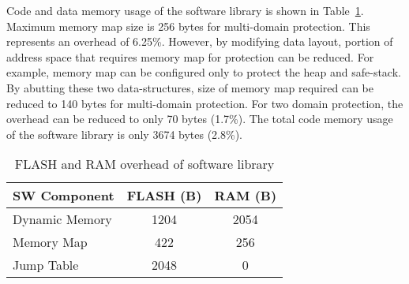 %
%
%
%
%
%
Code and data memory usage of the software library is shown in Table~\ref{tab:swlibsize}.
%
Maximum memory map size is 256 bytes for multi-domain protection.
%
This represents an overhead of 6.25\%.
%
However, by modifying data layout, portion of address space that requires memory map for protection can be reduced.
%
For example, memory map can be configured only to protect the heap and safe-stack.
%
By abutting these two data-structures, size of memory map required can be reduced to 140 bytes for multi-domain protection.
%
For two domain protection, the overhead can be reduced to only 70 bytes (1.7\%).
%
The total code memory usage of the software library is only 3674 bytes (2.8\%).
%
\begin{table}[htdp]
\centering
\small{
\begin{tabular}{|l|c|c|}
	\hline
	SW Component & FLASH (B) & RAM (B)\\
	\hline
	Dynamic Memory & 1204 & 2054\\
	Memory Map & 422 & 256 \\
	Jump Table & 2048 & 0 \\
	\hline
\end{tabular}}
\caption{FLASH and RAM overhead of software library}
\label{tab:swlibsize}
\end{table}
%

